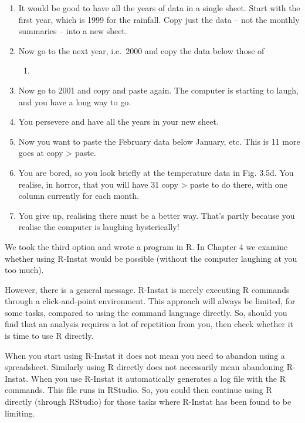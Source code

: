 \documentclass[
  letterpaper,
  DIV=11,
  numbers=noendperiod]{scrreprt}
\providecommand{\tightlist}{%
  \setlength{\itemsep}{0pt}\setlength{\parskip}{0pt}}\usepackage{longtable,booktabs,array}
\begin{document}
\begin{enumerate}
\def\labelenumi{\arabic{enumi})}
\item
  It would be good to have all the years of data in a single sheet.
  Start with the first year, which is 1999 for the rainfall. Copy just
  the data -- not the monthly summaries -- into a new sheet.
\item
  Now go to the next year, i.e.~2000 and copy the data below those of

  \begin{enumerate}
  \def\labelenumii{\arabic{enumii}.}
  \setcounter{enumii}{1998}
  \tightlist
  \item
  \end{enumerate}
\item
  Now go to 2001 and copy and paste again. The computer is starting to
  laugh, and you have a long way to go.
\item
  You persevere and have all the years in your new sheet.
\item
  Now you want to paste the February data below January, etc. This is 11
  more goes at copy \textgreater{} paste.
\item
  You are bored, so you look briefly at the temperature data in Fig.
  3.5d. You realise, in horror, that you will have 31 copy
  \textgreater{} paste to do there, with one column currently for each
  month.
\item
  You give up, realising there must be a better way. That's partly
  because you realise the computer is laughing hysterically!
\end{enumerate}

We took the third option and wrote a program in R. In Chapter 4 we
examine whether using R-Instat would be possible (without the computer
laughing at you too much).

However, there is a general message. R-Instat is merely executing R
commands through a click-and-point environment. This approach will
always be limited, for some tasks, compared to using the command
language directly. So, should you find that an analysis requires a lot
of repetition from you, then check whether it is time to use R directly.

When you start using R-Instat it does not mean you need to abandon using
a spreadsheet. Similarly using R directly does not necessarily mean
abandoning R-Instat. When you use R-Instat it automatically generates a
log file with the R commands. This file runs in RStudio. So, you could
then continue using R directly (through RStudio) for those tasks where
R-Instat has been found to be limiting.
\end{document}

